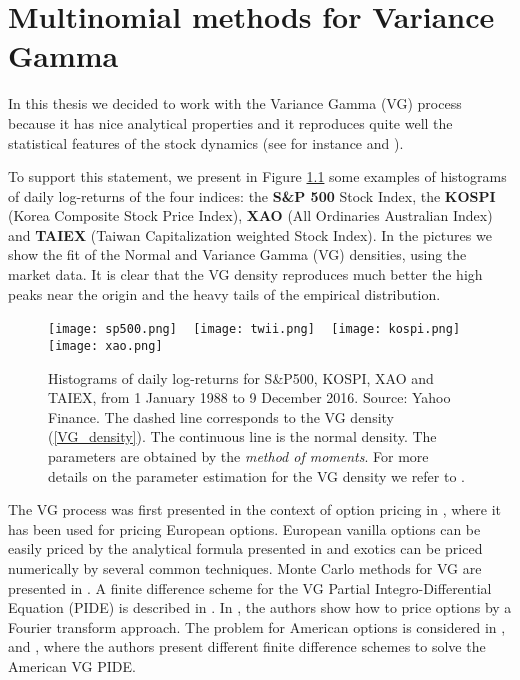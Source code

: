 

\chapter{Multinomial methods for Variance Gamma}\label{Chapter3}
\minitoc%

\vspace{5em}


 
 
In this thesis we decided to work with the Variance Gamma (VG) process because it has nice analytical properties and 
it reproduces quite well the statistical features of the stock dynamics (see for instance \cite{Cont} and \cite{Ait12}).

To support this statement, 
we present in Figure \ref{FigPDF} some examples of histograms of
daily log-returns of the four indices:  
the \textbf{S\&P 500} Stock Index, 
the \textbf{KOSPI} (Korea Composite Stock Price Index), 
\textbf{XAO} (All Ordinaries Australian Index)  
and \textbf{TAIEX} (Taiwan Capitalization weighted Stock Index).
In the pictures we show the fit of the Normal and Variance Gamma (VG) densities, using the market data. 
It is clear that the 
VG density reproduces much better the high peaks near the origin and the heavy tails of the empirical distribution.

\begin{figure}[t!]
 \centering
 \texttt{[image: sp500.png]}
 ~
 \texttt{[image: twii.png]}
 ~
 \texttt{[image: kospi.png]}
 ~
 \texttt{[image: xao.png]}
 \caption{Histograms of daily log-returns for S\&P500, KOSPI, XAO and TAIEX, from 1 January 1988 to 9 December 2016. Source: Yahoo Finance.
 The dashed line corresponds to the VG density (\ref{VG_density}). 
 The continuous line is the normal density. 
 The parameters are obtained by the \emph{method of moments}. For more details on the parameter estimation for the VG density we refer to \cite{Se04}.}
 \label{FigPDF}
\end{figure} 

The VG process was first presented in the context of option pricing 
in \cite{MaMi91}, where it has been used for pricing European options.
European vanilla options can be easily priced by the analytical formula presented in \cite{MCC98} and exotics
can be priced numerically by several common techniques.
Monte Carlo methods for VG are presented in \cite{Fu00}. 
A finite difference scheme for the VG Partial Integro-Differential Equation (PIDE) 
is described in \cite{CoVo05b}. In \cite{CaMa98}, the authors show how to price options by a Fourier transform approach.
The problem for American options is considered in \cite{Al05}, \cite{Oo05} and \cite{HiMa01}, where the authors present different finite difference 
schemes to solve the American VG PIDE.

